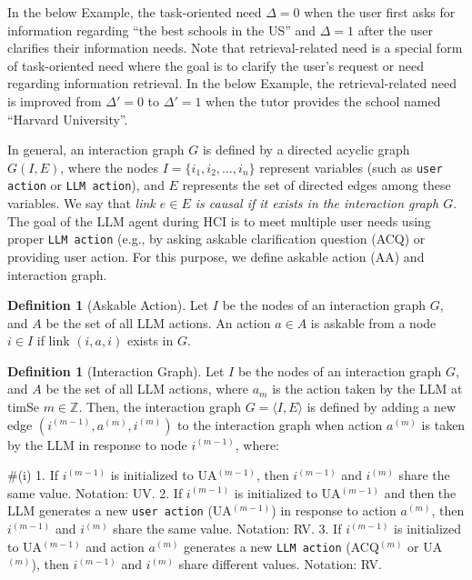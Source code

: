 \documentclass{article} %
\theoremstyle{definition}
\newtheorem{definition}[theorem]{Definition}
\begin{document}
In the below Example, the task-oriented need $\Delta = 0$ when the user first asks for information regarding ``the best schools in the US'' and $\Delta = 1$ after the user clarifies their information needs.
Note that retrieval-related need is a special form of task-oriented need where the goal is to clarify the user's request or need regarding information retrieval.
In the below Example, the retrieval-related need is improved from $\Delta' = 0$ to $\Delta' = 1$ when the tutor provides the school named ``Harvard University''.

In general, an interaction graph $G$ is defined by a directed acyclic graph $G(I,E)$, where the nodes $I = \{i_1, i_2, \ldots, i_n\}$ represent variables (such as \texttt{user action} or \texttt{LLM action}), and $E$ represents the set of directed edges among these variables.
We say that \textit{link $e \in E$ is causal if it exists in the interaction graph $G$}.
The goal of the LLM agent during HCI is to meet multiple user needs using proper \texttt{LLM action} (e.g., by asking \colorbox{questioncolor}{askable clarification question} (ACQ) or providing \colorbox{answercolor}{user action}.
For this purpose, we define askable action (AA) and interaction graph.
\begin{definition}[Askable Action]
    Let $I$ be the nodes of an interaction graph $G$, and $A$ be the set of all LLM actions.
    An action $a \in A$ is askable from a node $i \in I$ if link $(i, a, i)$ exists in $G$.
\end{definition}

\begin{definition}[Interaction Graph]
    Let $I$ be the nodes of an interaction graph $G$, and $A$ be the set of all LLM actions, where $a_m$ is the action taken by the LLM at timSe $m \in \mathbb{Z}$.
    Then, the interaction graph $G = \langle I, E \rangle$ is defined by adding a new edge $(i^{(m-1)}, a^{(m)}, i^{(m)})$ to the interaction graph when action $a^{(m)}$ is taken by the LLM in response to node $i^{(m-1)}$, where:

    \#\nopagebreak(i)
    1. If $i^{(m-1)}$ is initialized to UA$^{(m-1)}$, then $i^{(m-1)}$ and $i^{(m)}$ share the same value. Notation: UV.
    2. If $i^{(m-1)}$ is initialized to UA$^{(m-1)}$ and then the LLM generates a new \texttt{user action} (UA$^{(m-1)}$) in response to action $a^{(m)}$, then $i^{(m-1)}$ and $i^{(m)}$ share the same value. Notation: RV.
    3. If $i^{(m-1)}$ is initialized to UA$^{(m-1)}$ and action $a^{(m)}$ generates a new \texttt{LLM action} (ACQ$^{(m)}$ or UA$^{(m)}$), then $i^{(m-1)}$ and $i^{(m)}$ share different values. Notation: RV.
\end{definition}
\end{document}
